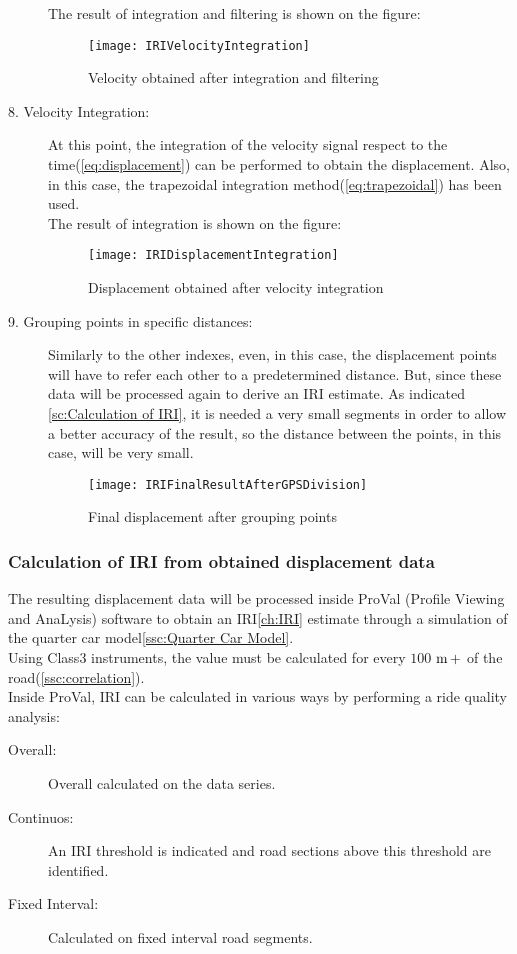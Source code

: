 \documentclass[tesi]{subfiles}
\begin{document}
\begin{description}
The result of integration and filtering is shown on the figure:
\begin{figure}[H]
\centering
\texttt{[image: IRIVelocityIntegration]}
\caption{Velocity obtained after integration and filtering}
\end{figure}
\item[8. Velocity Integration:]
At this point, the integration of the velocity signal respect to the time(\ref{eq:displacement}) can be performed to obtain the displacement. Also, in this case, the trapezoidal integration method(\ref{eq:trapezoidal}) has been used.\\

The result of integration is shown on the figure:

\begin{figure}[H]
\centering
\texttt{[image: IRIDisplacementIntegration]}
\caption{Displacement obtained after velocity integration}
\end{figure}
\item[9. Grouping points in specific distances:] Similarly to the other indexes, even, in this case, the displacement points will have to refer each other to a predetermined distance. 
But, since these data will be processed again to derive an IRI estimate. 
As indicated \ref{sc:Calculation of IRI}, it is needed a very small segments in order to allow a better accuracy of the result, so the distance between the points, in this case, will be very small.


\begin{figure}[H]
\centering
\texttt{[image: IRIFinalResultAfterGPSDivision]}
\caption{Final displacement after grouping points}
\end{figure}

\end{description}



\subsubsection{Calculation of IRI from obtained displacement data}
The resulting displacement data will be processed inside ProVal (Profile Viewing and AnaLysis) software to obtain an IRI\ref{ch:IRI} estimate through a simulation of the quarter car model\ref{ssc:Quarter Car Model}.\\
Using Class3 instruments, the value must be calculated for every $100$ $\si{\meter}\thinspace +$ of the road(\ref{ssc:correlation}).\\
Inside ProVal, IRI can be calculated in various ways by performing a ride quality analysis:
\begin{description}
\item[Overall:] Overall calculated on the data series.
\item[Continuos:] An IRI threshold is indicated and road sections above this threshold are identified.
\item[Fixed Interval:] Calculated on fixed interval road	 segments.
\end{description}
\end{document}

